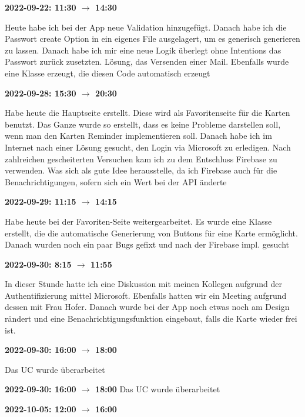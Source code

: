 \vspace{0.5cm} \textbf{2022-09-22: 11:30 $\rightarrow$ 14:30} 

Heute habe ich bei der
App neue Validation hinzugefügt. Danach habe ich die Passwort create
Option in ein eigenes File ausgelagert, um es generisch generieren zu
lassen. Danach habe ich mir eine neue Logik überlegt ohne Intentions das
Passwort zurück zusetzten. Lösung, das Versenden einer Mail. Ebenfalls wurde eine Klasse erzeugt, die diesen Code
automatisch erzeugt

\vspace{0.5cm} \textbf{2022-09-28: 15:30 $\rightarrow$ 20:30} 

Habe heute die Hauptseite erstellt. Diese wird als Favoritenseite für die Karten
benutzt. Das Ganze wurde so erstellt, dass es keine Probleme darstellen soll, wenn man den Karten Reminder implementieren soll. Danach habe ich im Internet nach einer Lösung gesucht, den Login via Microsoft zu erledigen. Nach zahlreichen gescheiterten Versuchen kam ich zu dem Entschluss Firebase zu verwenden. Was sich als gute Idee herausstelle, da ich Firebase auch für die Benachrichtigungen, sofern sich ein Wert bei der API änderte

\vspace{0.5cm} \textbf{2022-09-29: 11:15 $\rightarrow$ 14:15} 

Habe heute bei der Favoriten-Seite weitergearbeitet. Es wurde eine Klasse
erstellt, die die automatische Generierung von Buttons für eine Karte erm\"oglicht. Danach wurden noch ein paar Bugs gefixt und nach der Firebase impl. gesucht

\vspace{0.5cm} \textbf{2022-09-30: 8:15 $\rightarrow$ 11:55} 

In dieser Stunde hatte ich eine  Diskussion mit meinen Kollegen aufgrund der
Authentifizierung mittel Microsoft. Ebenfalls hatten wir ein Meeting
aufgrund dessen mit Frau Hofer. Danach wurde bei der App noch etwas noch
am Design rändert und eine Benachrichtigungsfunktion eingebaut, falls die Karte
wieder frei ist.

\vspace{0.5cm} \textbf{2022-09-30: 16:00 $\rightarrow$ 18:00} 

Das UC wurde überarbeitet

\vspace{0.5cm} \textbf{2022-09-30: 16:00 $\rightarrow$ 18:00} 
Das UC wurde überarbeitet

\vspace{0.5cm} \textbf{2022-10-05: 12:00 $\rightarrow$ 16:00}


